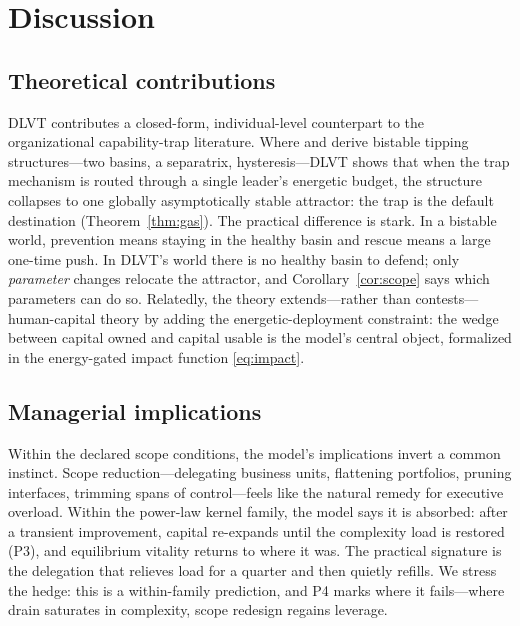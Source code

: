 \section{Discussion}
\label{sec:discussion}

\subsection{Theoretical contributions}
\label{sec:contributions}

DLVT contributes a closed-form, individual-level counterpart to the
organizational capability-trap literature. Where
\citet{repenning2002capability} and \citet{rahmandad2016capability} derive
bistable tipping structures---two basins, a separatrix, hysteresis---DLVT
shows that when the trap mechanism is routed through a single leader's
energetic budget, the structure collapses to one globally asymptotically
stable attractor: the trap is the default destination
(Theorem~\ref{thm:gas}). The practical difference is stark. In a bistable
world, prevention means staying in the healthy basin and rescue means a
large one-time push. In DLVT's world there is no healthy basin to defend;
only \emph{parameter} changes relocate the attractor, and
Corollary~\ref{cor:scope} says which parameters can do so. Relatedly, the
theory extends---rather than contests---human-capital theory
\citep{becker1993human} by adding the energetic-deployment constraint: the
wedge between capital owned and capital usable is the model's central
object, formalized in the energy-gated impact function \eqref{eq:impact}.

\subsection{Managerial implications}
\label{sec:implications}

Within the declared scope conditions, the model's implications invert a
common instinct. Scope reduction---delegating business units, flattening
portfolios, pruning interfaces, trimming spans of control---feels like the
natural remedy for executive overload. Within the power-law kernel family,
the model says it is absorbed: after a transient improvement, capital
re-expands until the complexity load is restored (P3), and equilibrium
vitality returns to where it was. The practical signature is the
delegation that relieves load for a quarter and then quietly refills. We
stress the hedge: this is a within-family prediction, and P4 marks where
it fails---where drain saturates in complexity, scope redesign regains
leverage.

